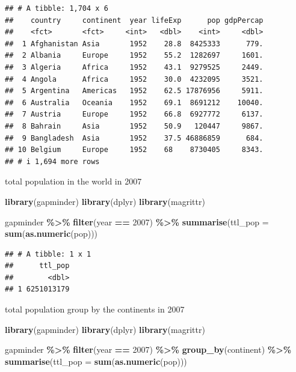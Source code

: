 \documentclass[
]{book}
\newenvironment{Shaded}{\begin{snugshade}}{\end{snugshade}}
\newcommand{\AttributeTok}[1]{\textcolor[rgb]{0.13,0.29,0.53}{#1}}
\newcommand{\DecValTok}[1]{\textcolor[rgb]{0.00,0.00,0.81}{#1}}
\newcommand{\FunctionTok}[1]{\textcolor[rgb]{0.13,0.29,0.53}{\textbf{#1}}}
\newcommand{\NormalTok}[1]{#1}
\newcommand{\SpecialCharTok}[1]{\textcolor[rgb]{0.81,0.36,0.00}{\textbf{#1}}}
\theoremstyle{definition}
\theoremstyle{definition}
\theoremstyle{definition}
\theoremstyle{definition}
\theoremstyle{remark}
\begin{document}
\begin{verbatim}
## # A tibble: 1,704 x 6
##    country     continent  year lifeExp      pop gdpPercap
##    <fct>       <fct>     <int>   <dbl>    <int>     <dbl>
##  1 Afghanistan Asia       1952    28.8  8425333      779.
##  2 Albania     Europe     1952    55.2  1282697     1601.
##  3 Algeria     Africa     1952    43.1  9279525     2449.
##  4 Angola      Africa     1952    30.0  4232095     3521.
##  5 Argentina   Americas   1952    62.5 17876956     5911.
##  6 Australia   Oceania    1952    69.1  8691212    10040.
##  7 Austria     Europe     1952    66.8  6927772     6137.
##  8 Bahrain     Asia       1952    50.9   120447     9867.
##  9 Bangladesh  Asia       1952    37.5 46886859      684.
## 10 Belgium     Europe     1952    68    8730405     8343.
## # i 1,694 more rows
\end{verbatim}

total population in the world in 2007

\begin{Shaded}
\begin{Highlighting}[]
\FunctionTok{library}\NormalTok{(gapminder)}
\FunctionTok{library}\NormalTok{(dplyr)}
\FunctionTok{library}\NormalTok{(magrittr)}

\NormalTok{gapminder }\SpecialCharTok{\%\textgreater{}\%}
  \FunctionTok{filter}\NormalTok{(year }\SpecialCharTok{==} \DecValTok{2007}\NormalTok{) }\SpecialCharTok{\%\textgreater{}\%}
  \FunctionTok{summarise}\NormalTok{(}\AttributeTok{ttl\_pop =} \FunctionTok{sum}\NormalTok{(}\FunctionTok{as.numeric}\NormalTok{(pop)))}
\end{Highlighting}
\end{Shaded}

\begin{verbatim}
## # A tibble: 1 x 1
##      ttl_pop
##        <dbl>
## 1 6251013179
\end{verbatim}

total population group by the continents in 2007

\begin{Shaded}
\begin{Highlighting}[]
\FunctionTok{library}\NormalTok{(gapminder)}
\FunctionTok{library}\NormalTok{(dplyr)}
\FunctionTok{library}\NormalTok{(magrittr)}

\NormalTok{gapminder }\SpecialCharTok{\%\textgreater{}\%}
  \FunctionTok{filter}\NormalTok{(year }\SpecialCharTok{==} \DecValTok{2007}\NormalTok{) }\SpecialCharTok{\%\textgreater{}\%}
  \FunctionTok{group\_by}\NormalTok{(continent) }\SpecialCharTok{\%\textgreater{}\%}
  \FunctionTok{summarise}\NormalTok{(}\AttributeTok{ttl\_pop =} \FunctionTok{sum}\NormalTok{(}\FunctionTok{as.numeric}\NormalTok{(pop)))}
\end{Highlighting}
\end{Shaded}
\end{document}
